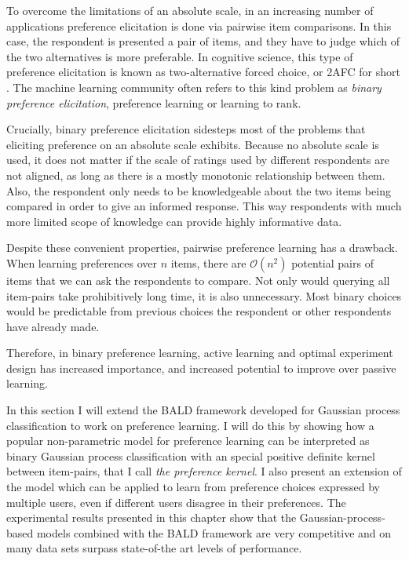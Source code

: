 To overcome the limitations of an absolute scale, in an increasing number of applications preference elicitation is done via pairwise item comparisons. In this case, the respondent is presented a pair of items, and they have to judge which of the two alternatives is more preferable. In cognitive science, this type of preference elicitation is known as two-alternative forced choice, or 2AFC for short \citep{2AFC}. The machine learning community often refers to this kind problem as \emph{binary preference elicitation}, preference learning or learning to rank.

Crucially, binary preference elicitation sidesteps most of the problems that eliciting preference on an absolute scale exhibits. Because no absolute scale is used, it does not matter if the scale of ratings used by different respondents are not aligned, as long as there is a mostly monotonic relationship between them. Also, the respondent only needs to be knowledgeable about the two items being compared in order to give an informed response. This way respondents with much more limited scope of knowledge can provide highly informative data.

Despite these convenient properties, pairwise preference learning has a drawback. When learning preferences over $n$ items, there are $\mathcal{O}(n^2)$ potential pairs of items that we can ask the respondents to compare. Not only would querying all item-pairs take prohibitively long time, it is also unnecessary. Most binary choices would be predictable from previous choices the respondent or other respondents have already made.

Therefore, in binary preference learning, active learning and optimal experiment design has increased importance, and increased potential to improve over passive learning.

In this section I will extend the BALD framework developed for Gaussian process classification to work on preference learning. I will do this by showing how a popular non-parametric model for preference learning can be interpreted as binary Gaussian process classification with an special positive definite kernel between item-pairs, that I call \emph{the preference kernel}. I also present an extension of the model which can be applied to learn from preference choices expressed by multiple users, even if different users disagree in their preferences. The experimental results presented in this chapter show that the Gaussian-process-based models combined with the BALD framework are very competitive and on many data sets surpass state-of-the art levels of performance.

